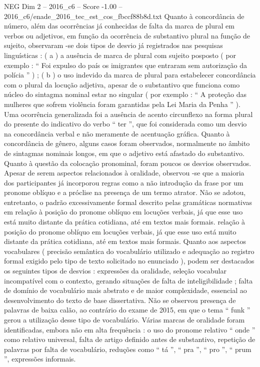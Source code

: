 \begin{textsample}{NEG Dim 2 – 2016\_c6 – Score -1.00 – 2016\_c6/enade\_2016\_tec\_est\_cos\_fbccf88b8d.txt}
Quanto à concordância de número, além das ocorrências já conhecidas de falta da marca de plural em verbos ou adjetivos, em função da ocorrência de substantivo plural na função de sujeito, observaram -se dois tipos de desvio já registrados nas pesquisas linguísticas : ( a ) a ausência de marca de plural com sujeito posposto ( por exemplo : “ Foi expulso do país os imigrantes que entraram sem autorização da polícia ” ) ; ( b ) o uso indevido da marca de plural para estabelecer concordância com o plural da locução adjetiva, apesar de o substantivo que funciona como núcleo do sintagma nominal estar no singular ( por exemplo : “ A proteção das mulheres que sofrem violência foram garantidas pela Lei Maria da Penha ” ).
Uma ocorrência generalizada foi a ausência de acento circunflexo na forma plural do presente do indicativo do verbo “ ter ”, que foi considerada como um desvio na concordância verbal e não meramente de acentuação gráfica.
Quanto à concordância de gênero, alguns casos foram observados, normalmente no âmbito de sintagmas nominais longos, em que o adjetivo está afastado do substantivo.
Quanto à questão da colocação pronominal, foram poucos os desvios observados.
Apesar de serem aspectos relacionados à oralidade, observou -se que a maioria dos participantes já incorporou regras como a não introdução da frase por um pronome oblíquo e a próclise na presença de um termo atrator.
Não se adotou, entretanto, o padrão excessivamente formal descrito pelas gramáticas normativas em relação à posição do pronome oblíquo em locuções verbais, já que esse uso está muito distante da prática cotidiana, até em textos mais formais. relação à posição do pronome oblíquo em locuções verbais, já que esse uso está muito distante da prática cotidiana, até em textos mais formais.
Quanto aos aspectos vocabulares ( precisão semântica do vocabulário utilizado e adequação ao registro formal exigido pelo tipo de texto solicitado no enunciado ), podem ser destacados os seguintes tipos de desvios : expressões da oralidade, seleção vocabular incompatível com o contexto, gerando situações de falta de inteligibilidade ; falta de domínio de vocabulário mais abstrato e de maior complexidade, essencial ao desenvolvimento do texto de base dissertativa.
Não se observou presença de palavras de baixa calão, ao contrário do exame de 2015, em que o tema “ funk ” gerou a utilização desse tipo de vocabulário.
Várias marcas de oralidade foram identificadas, embora não em alta frequência : o uso do pronome relativo “ onde ” como relativo universal, falta de artigo definido antes de substantivo, repetição de palavras por falta de vocabulário, reduções como “ tá ”, “ pra ”, “ pro ”, “ prum ”, expressões informais.

\end{textsample}
